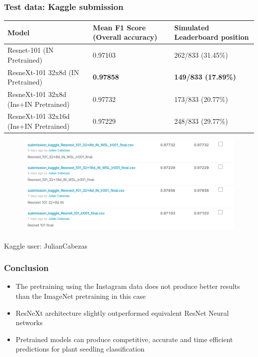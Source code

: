 \documentclass{beamer}
\begin{document}
\begin{frame}
	\frametitle{Test data: Kaggle submission}
	
\begin{table}[h]
	\footnotesize
	\begin{center}
		\begin{tabular}{|p{5cm}|p{2.8cm}|p{2.8cm}|}
			\hline
			Model & Mean F1 Score (Overall accuracy) & Simulated Leaderboard position\\
			\hline\hline
			Resnet-101 (IN Pretrained) & 0.97103 & 262/833 (31.45\%) \\
			ResneXt-101 32x8d (IN Pretrained) & \textbf{0.97858} & \textbf{149/833 (17.89\%)}  \\
			ResneXt-101 32x8d (Ins+IN Pretrained) & 0.97732 & 173/833 (20.77\%)   \\
			ResneXt-101 32x16d (Ins+IN Pretrained) & 0.97229 & 248/833 (29.77\%) \\
			\hline
		\end{tabular}
	\end{center}
	\label{table:test}
\end{table}

	\begin{figure}
	\centering
	\includegraphics[width=0.7\linewidth]{Screenshot}
	\label{fig:screenshot001}
\end{figure}

Kaggle user: JulianCabezas
	
\end{frame}

\begin{frame}
	
	\frametitle{Conclusion}
	
	\begin{itemize}
		\item The pretraining using the Instagram data does not produce better results than the ImageNet pretraining in this case
		\item ResNeXt architecture slightly outperformed equivalent ResNet Neural networks 
		\item Pretrained models can produce competitive, accurate and time efficient predictions for plant seedling classification
	\end{itemize}
	
	
\end{frame}
\end{document}
